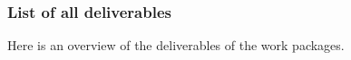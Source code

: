 \subsubsection*{List of all deliverables}\label{sec:deliverables}

Here is an overview of the deliverables of the work packages. 

{\footnotesize{}}

